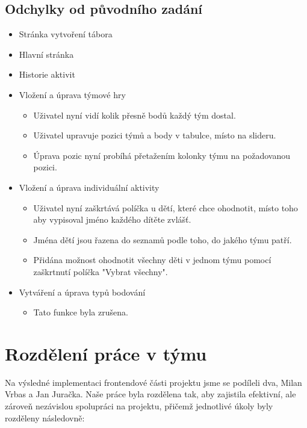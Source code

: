 \documentclass[a4paper, 12pt]{article} %
\begin{document}
\subsection{Odchylky od původního zadání}
\begin{itemize}
    \item Stránka vytvoření tábora
    \item Hlavní stránka
    \item Historie aktivit
    \item Vložení a úprava týmové hry
    \begin{itemize}
        \item Uživatel nyní vidí kolik přesně bodů každý tým dostal.
        \item Uživatel upravuje pozici týmů a body v tabulce, místo na slideru.
        \item Úprava pozic nyní probíhá přetažením kolonky týmu na požadovanou pozici.
    \end{itemize}
    \item Vložení a úprava individuální aktivity
    \begin{itemize}
        \item Uživatel nyní zaškrtává políčka u dětí, které chce ohodnotit, místo toho aby vypisoval jméno každého dítěte zvlášť.
        \item Jména dětí jsou řazena do seznamů podle toho, do jakého týmu patří.
        \item Přidána možnost ohodnotit všechny děti v jednom týmu pomocí zaškrtnutí políčka "Vybrat všechny".
    \end{itemize}
    \item Vytváření a úprava typů bodování
    \begin{itemize}
        \item Tato funkce byla zrušena.
    \end{itemize}        
\end{itemize}
\section{Rozdělení práce v týmu}

Na výsledné implementaci frontendové části projektu jsme se podíleli dva, Milan Vrbas a 
Jan Juračka. Naše práce byla rozdělena tak, aby zajistila efektivní, ale zároveň nezávislou 
spolupráci na projektu, přičemž jednotlivé úkoly byly rozděleny následovně:
\end{document}
